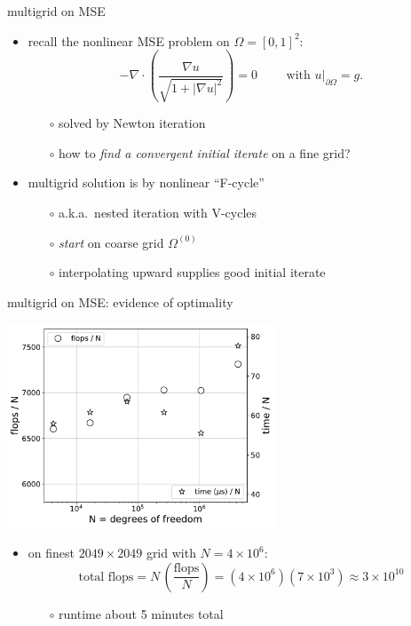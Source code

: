 \documentclass[hide notes,intlimits,usenames,dvipsnames]{beamer}
\newcommand{\grad}{\nabla}
\begin{document}
\begin{frame}{multigrid on MSE}
\begin{itemize}
\item recall the nonlinear MSE problem on $\Omega=[0,1]^2$:
\small
    $$- \grad\cdot \left(\frac{\grad u}{\sqrt{1 + |\grad u|^2}}\right) = 0  \qquad \text{ with } u\big|_{\partial \Omega} = g.$$
\normalsize
    \vspace{-3mm}
    \begin{itemize}
    \item[$\circ$] solved by Newton iteration
    \item[$\circ$] how to \emph{find a convergent initial iterate} on a fine grid?
    \end{itemize}
\item multigrid solution is by nonlinear ``F-cycle''
    \begin{itemize}
    \item[$\circ$] a.k.a.~nested iteration with V-cycles
    \item[$\circ$] \emph{start} on coarse grid $\Omega^{(0)}$
    \item[$\circ$] interpolating upward supplies good initial iterate
    \end{itemize}
\end{itemize}

\begin{center}
\begin{tikzpicture}[scale=1.0]

\end{tikzpicture}
\end{center}
\end{frame}


\begin{frame}{multigrid on MSE: evidence of optimality}

\begin{center}
\includegraphics[width=0.6\textwidth]{figs/minoptimal}
\end{center}
\begin{itemize}
\item on finest $2049\times 2049$ grid with $N=4\times 10^6$:
    $$\text{total flops} = N \, \left(\frac{\text{flops}}{N}\right) = (4\times 10^6) (7 \times 10^3) \approx 3 \times 10^{10}$$
    \vspace{-3mm}
    \begin{itemize}
    \item[$\circ$] runtime about 5 minutes total
    \end{itemize}
\end{itemize}
\end{frame}
\end{document}
